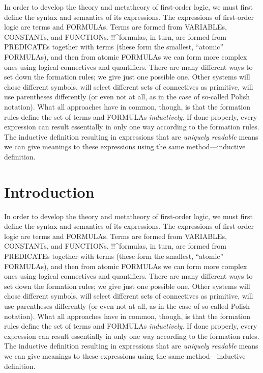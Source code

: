 \documentclass[10pt,a4paper]{article}
\newcommand*{\olup}[1]{\MakeUppercase{#1}}
\theoremstyle{plain}
\theoremstyle{definition}
\theoremstyle{remark}
\newcommand*{\olfileid}[3]{}
\newcommand*{\olsection}[1]{\section*{#1}}
\begin{document}
In order to develop the theory and metatheory of first-order logic, we
must first define the syntax and semantics of its expressions.  The
expressions of first-order logic are terms and \olup{formula}s.  Terms
are formed from \olup{variable}s, \olup{constant}s, and \olup{function}s.
!!^{formula}s, in turn, are formed from \olup{predicate}s together with
terms (these form the smallest, ``atomic'' \olup{formula}s), and then
from atomic \olup{formula}s we can form more complex ones using logical
connectives and quantifiers.  There are many different ways to set
down the formation rules; we give just one possible one. Other systems
will chose different symbols, will select different sets of
connectives as primitive, will use parentheses differently (or even not
at all, as in the case of so-called Polish notation).  What all
approaches have in common, though, is that the formation rules define
the set of terms and \olup{formula}s \emph{inductively}. If done
properly, every expression can result essentially in only one way
according to the formation rules.  The inductive definition resulting
in expressions that are \emph{uniquely readable} means we can give
meanings to these expressions using the same method---inductive
definition.





\olfileid{fol}{syn}{int}

\olsection{Introduction}

In order to develop the theory and metatheory of first-order logic, we
must first define the syntax and semantics of its expressions.  The
expressions of first-order logic are terms and \olup{formula}s.  Terms
are formed from \olup{variable}s, \olup{constant}s, and \olup{function}s.
!!^{formula}s, in turn, are formed from \olup{predicate}s together with
terms (these form the smallest, ``atomic'' \olup{formula}s), and then
from atomic \olup{formula}s we can form more complex ones using logical
connectives and quantifiers.  There are many different ways to set
down the formation rules; we give just one possible one. Other systems
will chose different symbols, will select different sets of
connectives as primitive, will use parentheses differently (or even not
at all, as in the case of so-called Polish notation).  What all
approaches have in common, though, is that the formation rules define
the set of terms and \olup{formula}s \emph{inductively}. If done
properly, every expression can result essentially in only one way
according to the formation rules.  The inductive definition resulting
in expressions that are \emph{uniquely readable} means we can give
meanings to these expressions using the same method---inductive
definition.
\end{document}
